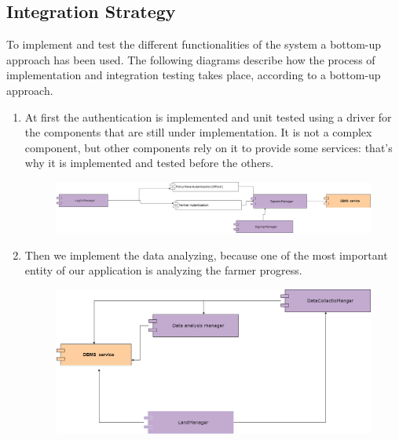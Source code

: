 \subsection{Integration Strategy}
\vspace{0.5cm}

To implement and test the different functionalities of the system a bottom-up approach has been used. The following diagrams describe how the process of implementation and integration testing takes place, according to a bottom-up approach. \\

\begin{enumerate}
    
\item At first the authentication is implemented and unit tested using a driver for the components that are still under implementation. It is not a complex component, but other components rely on it to provide some services: that’s why it is implemented and tested before the others. \\
\begin{figure}[H]
  \centering
  \includegraphics[width=1\textwidth,keepaspectratio]{figures/test1.png}
\end{figure}

\item Then we implement the data analyzing, because one of the most important entity of our application is analyzing the farmer progress.\\
\begin{figure}[H]
  \centering
  \includegraphics[width=1\textwidth,keepaspectratio]{figures/test2.png}
\end{figure}


\end{enumerate}
